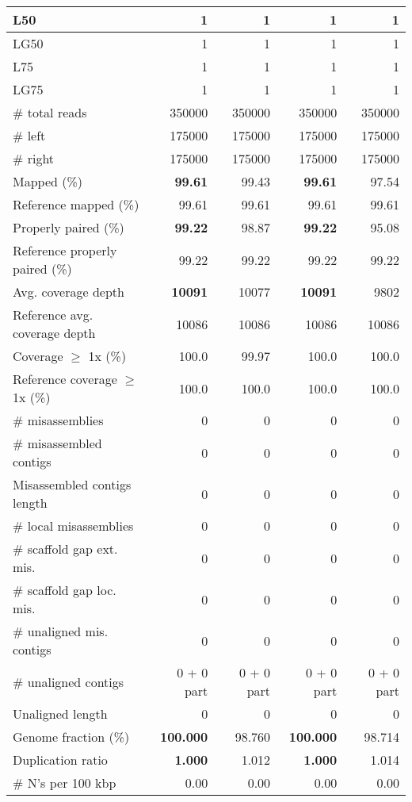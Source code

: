\documentclass[12pt,a4paper]{article}
\begin{document}
\begin{table}[ht]
\begin{center}
\begin{tabular}{|l*{4}{|r}|}
L50 & 1 & 1 & 1 & 1 \\ \hline
LG50 & 1 & 1 & 1 & 1 \\ \hline
L75 & 1 & 1 & 1 & 1 \\ \hline
LG75 & 1 & 1 & 1 & 1 \\ \hline
\# total reads & 350000 & 350000 & 350000 & 350000 \\ \hline
\# left & 175000 & 175000 & 175000 & 175000 \\ \hline
\# right & 175000 & 175000 & 175000 & 175000 \\ \hline
Mapped (\%) & {\bf 99.61} & 99.43 & {\bf 99.61} & 97.54 \\ \hline
Reference mapped (\%) & 99.61 & 99.61 & 99.61 & 99.61 \\ \hline
Properly paired (\%) & {\bf 99.22} & 98.87 & {\bf 99.22} & 95.08 \\ \hline
Reference properly paired (\%) & 99.22 & 99.22 & 99.22 & 99.22 \\ \hline
Avg. coverage depth & {\bf 10091} & 10077 & {\bf 10091} & 9802 \\ \hline
Reference avg. coverage depth & 10086 & 10086 & 10086 & 10086 \\ \hline
Coverage $\geq$ 1x (\%) & 100.0 & 99.97 & 100.0 & 100.0 \\ \hline
Reference coverage $\geq$ 1x (\%) & 100.0 & 100.0 & 100.0 & 100.0 \\ \hline
\# misassemblies & 0 & 0 & 0 & 0 \\ \hline
\# misassembled contigs & 0 & 0 & 0 & 0 \\ \hline
Misassembled contigs length & 0 & 0 & 0 & 0 \\ \hline
\# local misassemblies & 0 & 0 & 0 & 0 \\ \hline
\# scaffold gap ext. mis. & 0 & 0 & 0 & 0 \\ \hline
\# scaffold gap loc. mis. & 0 & 0 & 0 & 0 \\ \hline
\# unaligned mis. contigs & 0 & 0 & 0 & 0 \\ \hline
\# unaligned contigs & 0 + 0 part & 0 + 0 part & 0 + 0 part & 0 + 0 part \\ \hline
Unaligned length & 0 & 0 & 0 & 0 \\ \hline
Genome fraction (\%) & {\bf 100.000} & 98.760 & {\bf 100.000} & 98.714 \\ \hline
Duplication ratio & {\bf 1.000} & 1.012 & {\bf 1.000} & 1.014 \\ \hline
\# N's per 100 kbp & 0.00 & 0.00 & 0.00 & 0.00 \\ \hline

\end{tabular}
\end{center}
\end{table}
\end{document}
